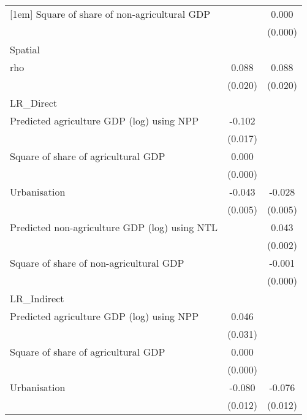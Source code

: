 {\begin{tabular}{l*{2}{c}}
[1em]
Square of share of non-agricultural GDP&                     &       0.000\sym{**} \\
                    &                     &     (0.000)         \\
\hline
Spatial             &                     &                     \\
rho                 &       0.088\sym{***}&       0.088\sym{***}\\
                    &     (0.020)         &     (0.020)         \\
\hline
LR\_Direct           &                     &                     \\
Predicted agriculture GDP (log) using NPP&      -0.102\sym{***}&                     \\
                    &     (0.017)         &                     \\
[1em]
Square of share of agricultural GDP&       0.000\sym{**} &                     \\
                    &     (0.000)         &                     \\
[1em]
Urbanisation        &      -0.043\sym{***}&      -0.028\sym{***}\\
                    &     (0.005)         &     (0.005)         \\
[1em]
Predicted non-agriculture GDP (log) using NTL&                     &       0.043\sym{***}\\
                    &                     &     (0.002)         \\
[1em]
Square of share of non-agricultural GDP&                     &      -0.001\sym{***}\\
                    &                     &     (0.000)         \\
\hline
LR\_Indirect         &                     &                     \\
Predicted agriculture GDP (log) using NPP&       0.046         &                     \\
                    &     (0.031)         &                     \\
[1em]
Square of share of agricultural GDP&       0.000         &                     \\
                    &     (0.000)         &                     \\
[1em]
Urbanisation        &      -0.080\sym{***}&      -0.076\sym{***}\\
                    &     (0.012)         &     (0.012)         \\

\end{tabular}}
